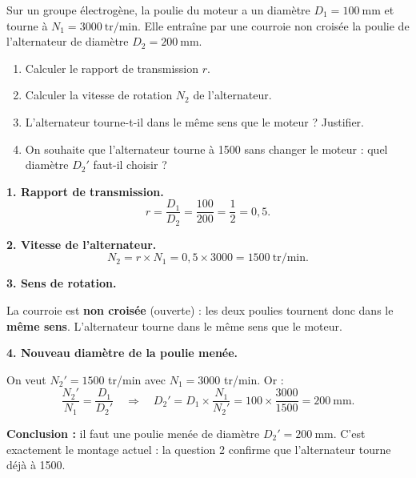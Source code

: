 \documentclass[11pt]{article}
\begin{document}
\begin{exoresolu}
Sur un groupe électrogène, la poulie du moteur a un diamètre $D_1 = \SI{100}{\text{mm}}$ et tourne à $N_1 = \SI{3000}{\text{tr/min}}$. Elle entraîne par une courroie non croisée la poulie de l'alternateur de diamètre $D_2 = \SI{200}{\text{mm}}$.
\begin{enumerate}
\item Calculer le rapport de transmission $r$.
\item Calculer la vitesse de rotation $N_2$ de l'alternateur.
\item L'alternateur tourne-t-il dans le même sens que le moteur ? Justifier.
\item On souhaite que l'alternateur tourne à \SI{1500}{} sans changer le moteur : quel diamètre $D_2'$ faut-il choisir ?
\end{enumerate}
\tcblower
\textbf{1. Rapport de transmission.}
\[ r = \frac{D_1}{D_2} = \frac{100}{200} = \frac{1}{2} = 0,5. \]

\textbf{2. Vitesse de l'alternateur.}
\[ N_2 = r \times N_1 = 0,5 \times 3000 = 1500\ \text{tr/min}. \]

\textbf{3. Sens de rotation.}

La courroie est \textbf{non croisée} (ouverte) : les deux poulies tournent donc dans le \textbf{même sens}. L'alternateur tourne dans le même sens que le moteur.

\textbf{4. Nouveau diamètre de la poulie menée.}

On veut $N_2' = 1500$ tr/min avec $N_1 = 3000$ tr/min. Or :
\[ \frac{N_2'}{N_1} = \frac{D_1}{D_2'} \quad \Rightarrow \quad D_2' = D_1 \times \frac{N_1}{N_2'} = 100 \times \frac{3000}{1500} = 200\ \text{mm}. \]

\textbf{Conclusion :} il faut une poulie menée de diamètre $D_2' = \SI{200}{\text{mm}}$. C'est exactement le montage actuel : la question 2 confirme que l'alternateur tourne déjà à \SI{1500}{}.
\end{exoresolu}
\end{document}
